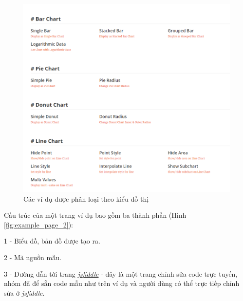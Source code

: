 \documentclass[12pt,a4paper]{article}
\begin{document}
\begin{figure}[htp]
	\begin{center}
    \includegraphics[scale=.6]{image/example_page}
    \caption{Các ví dụ được phân loại theo kiểu đồ thị}
    \label{fig:example_page}
	\end{center}
\end{figure}

Cấu trúc của một trang ví dụ bao gồm ba thành phần (Hình \ref{fig:example_page_2}):

\begin{list}{}{}
\item[1 - ] Biểu đồ, bản đồ được tạo ra.
\item[2 - ] Mã nguồn mẫu.
\item[3 - ] Đường dẫn tới trang \href{https://jsfiddle.net/}{\textit{jsfiddle}} - đây là một trang chỉnh sửa code trực tuyến, nhóm đã để sẵn code mẫu như trên ví dụ và người dùng có thể trực tiếp chỉnh sửa ở \textit{jsfiddle}.
\end{list}
\end{document}
